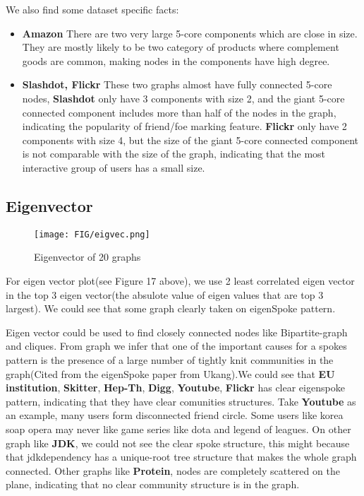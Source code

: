 \par We also find some dataset specific facts:
\begin{itemize}
\item \textbf{Amazon} There are two very large 5-core components which are close in size. They are mostly likely to be two category of products where complement goods are common, making nodes in the components have high degree.
\item \textbf{Slashdot, Flickr} These two graphs almost have fully connected 5-core nodes, \textbf{Slashdot} only have 3 components with size 2, and the giant 5-core connected component includes more than half of the nodes in the graph, indicating the popularity of friend/foe marking feature. \textbf{Flickr} only have 2 components with size 4, but the size of the giant 5-core connected component is not comparable with the size of the graph, indicating that the most interactive group of users has a small size.
\end{itemize}

\subsection{Eigenvector}
\begin{figure}[H]
\begin{center}
\texttt{[image: FIG/eigvec.png]}
\caption{Eigenvector of 20 graphs}
\end{center}
\end{figure}

\par For eigen vector plot(see Figure 17 above), we use 2 least correlated eigen vector in the top 3 eigen vector(the absulote value of eigen values that are top 3 largest). We could see that some graph clearly taken on eigenSpoke pattern.
\par Eigen vector could be used to find closely connected nodes like Bipartite-graph and cliques. From graph we infer that one of the important causes for a spokes pattern is the presence of a large number of tightly knit communities in the graph(Cited from the eigenSpoke paper from Ukang).We could see that \textbf{EU institution}, \textbf{Skitter}, \textbf{Hep-Th}, \textbf{Digg}, \textbf{Youtube}, \textbf{Flickr} has clear eigenspoke pattern, indicating that they have clear comunities structures. Take \textbf{Youtube} as an example, many users form disconnected friend circle. Some users like korea soap opera may never like game series like dota and legend of leagues. On other graph like \textbf{JDK}, we could not see the clear spoke structure, this might because that jdkdependency has a unique-root tree structure that makes the whole graph connected. Other graphs like \textbf{Protein}, nodes are completely scattered on the plane, indicating that no clear community structure is in the graph.

